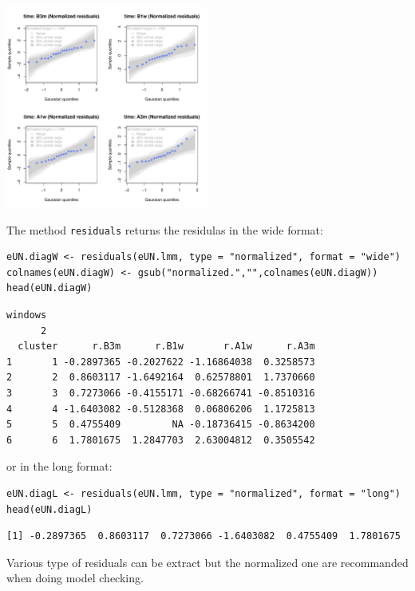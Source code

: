 \documentclass[12pt]{article}
\begin{document}
\begin{center}
\includegraphics[width=0.5\textwidth]{./figures/diag-qqplot.pdf}
\end{center}

\clearpage

The method \texttt{residuals} returns the residulas in the wide format:
\lstset{language=r,label= ,caption= ,captionpos=b,numbers=none}
\begin{lstlisting}
eUN.diagW <- residuals(eUN.lmm, type = "normalized", format = "wide")
colnames(eUN.diagW) <- gsub("normalized.","",colnames(eUN.diagW))
head(eUN.diagW)
\end{lstlisting}

\begin{verbatim}
windows 
      2
  cluster      r.B3m      r.B1w       r.A1w      r.A3m
1       1 -0.2897365 -0.2027622 -1.16864038  0.3258573
2       2  0.8603117 -1.6492164  0.62578801  1.7370660
3       3  0.7273066 -0.4155171 -0.68266741 -0.8510316
4       4 -1.6403082 -0.5128368  0.06806206  1.1725813
5       5  0.4755409         NA -0.18736415 -0.8634200
6       6  1.7801675  1.2847703  2.63004812  0.3505542
\end{verbatim}


or in the long format:
\lstset{language=r,label= ,caption= ,captionpos=b,numbers=none}
\begin{lstlisting}
eUN.diagL <- residuals(eUN.lmm, type = "normalized", format = "long")
head(eUN.diagL)
\end{lstlisting}

\begin{verbatim}
[1] -0.2897365  0.8603117  0.7273066 -1.6403082  0.4755409  1.7801675
\end{verbatim}


Various type of residuals can be extract but the normalized one are
recommanded when doing model checking.
\end{document}
